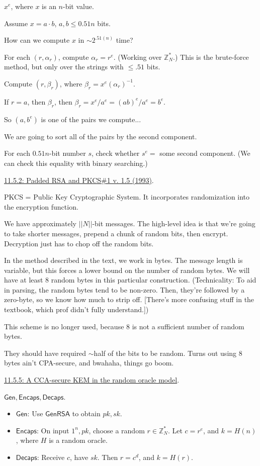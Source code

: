 \documentclass[12pt]{article}
\newcommand{\Z}{\mathbb{Z}}
\newcommand{\Encaps}{\mathsf{Encaps}}
\newcommand{\Decaps}{\mathsf{Decaps}}
\newcommand{\Gen}{\mathsf{Gen}}
\newcommand{\GenRSA}{\mathsf{GenRSA}}
\begin{document}
$x^e$, where $x$ is an $n$-bit value.

Assume $x=a\cdot b$, $a,b\leq0.51n$ bits.

How can we compute $x$ in $\sim2^{.51(n)}$ time?

For each $(r,\alpha_r)$, compute $\alpha_r=r^e$. (Working over $\Z_N^*$.) This is the brute-force method, but only over the strings with $\leq.51$ bits.

Compute $(r,\beta_r)$, where $\beta_r=x^e(\alpha_r)^{-1}$.

If $r=a$, then $\beta_r$, then $\beta_r=x^e/a^e=(ab)^e/a^e=b^e$.

So $(a,b^e)$ is one of the pairs we compute...

We are going to sort all of the pairs by the second component.

For each $0.51n$-bit number $s$, check whether $s^e=$ some second component. (We can check this equality with binary searching.)

\underline{11.5.2: Padded RSA and PKCS\#1 v. 1.5 (1993)}.

PKCS = Public Key Cryptographic System. It incorporates randomization into the encryption function.

We have approximately $||N||$-bit messages. The high-level idea is that we're going to take shorter messages, prepend a chunk of random bits, then encrypt. Decryption just has to chop off the random bits.

In the method described in the text, we work in bytes. The message length is variable, but this forces a lower bound on the number of random bytes. We will have at least 8 random bytes in this particular construction. (Technicality: To aid in parsing, the random bytes tend to be non-zero. Then, they're followed by a zero-byte, so we know how much to strip off. [There's more confusing stuff in the textbook, which prof didn't fully understand.])

This scheme is no longer used, because $8$ is not a sufficient number of random bytes.

They should have required $\sim$half of the bits to be random. Turns out using $8$ bytes ain't CPA-secure, and bwahaha, things go boom.

\underline{11.5.5: A CCA-secure KEM in the random oracle model}.

$\Gen,\Encaps,\Decaps$.\begin{itemize}

\item $\Gen$: Use $\GenRSA$ to obtain $pk,sk$.

\item $\Encaps$: On input $1^n,pk$, choose a random $r\in\Z_N^*$. Let $c=r^e$, and $k=H(n)$, where $H$ is a random oracle.

\item $\Decaps$: Receive $c$, have $sk$. Then $r=c^d$, and $k=H(r)$.

\end{itemize}
\end{document}
